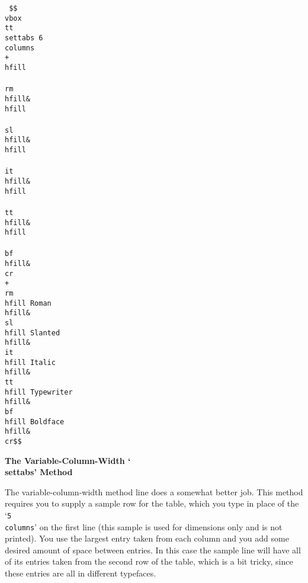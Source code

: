 \vbox{\tt {} \columns
\+\$\$\\vbox\lbr\\tt \\settabs 6 \\columns\cr
\+\\+\\hfill\\\\rm\\hfill\&\\hfill\\\\sl\\hfill\&\cr
\+\\hfill\\\\it\\hfill\&\\hfill\\\\tt\\hfill\&\\hfill\\\\bf\\hfill\&\\cr\cr
\+\\+\\rm\\hfill Roman\\hfill\&\\sl\\hfill Slanted\\hfill\&\\it\\hfill\cr
\+Italic\\hfill\&\\tt\\hfill Typewriter\\hfill\&\\bf\\hfill Boldface\\hfill\&\\cr\rbr\$\$\cr}

{\bf The Variable-Column-Width `\\settabs' Method}

The variable-column-width method line does a somewhat better job.  This
method requires you to supply a sample row for the table, which you type in place
of the `{\tt 5 \\columns}' on the first line (this sample is used for
dimensions only and is not printed). You use the largest entry taken from
each column and you add some desired amount of space between entries.
In this case the sample line will have all of its entries taken from the
second row of the table, which is a bit tricky, since these entries are all
in different typefaces.

